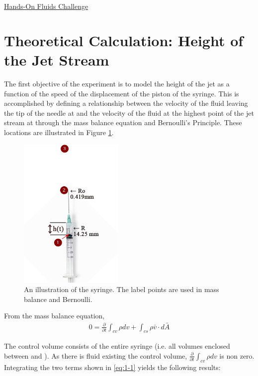 \documentclass{article}
\newcommand*\circled[1]{\tikz[baseline=(char.base)]{
            \node[shape=circle,draw,inner sep=2pt] (char) {#1};}}
\begin{document}
\begin{center}\underline{\huge Hands-On Fluids Challenge}\end{center}

\section{Theoretical Calculation: Height of the Jet Stream}
%
The first objective of the experiment is to model the height of the jet as a function of the speed of the displacement of the piston of the syringe. This is accomplished by defining a relationship between the velocity of the fluid leaving the tip of the needle at \circled{2} and the velocity of the fluid at the highest point of the jet stream at \circled{3} through the mass balance equation and Bernoulli's Principle. These locations are illustrated in Figure \ref{fig:1}.

%
\begin{figure}[h!]
\centering
  \includegraphics[width=50mm]{Syringe.png}
  \captionsetup{justification=centering}
  \caption{An illustration of the syringe. The label points are used in mass balance and Bernoulli.}
  \label{fig:1}
\end{figure}
%
From the mass balance equation,
\begin{align*}
0= \frac{\partial}{\partial{t}} \int_{cv} \rho dv + \int_{cs} \rho \bar{v} \cdot d\bar{A} \label{eq:1-1} \tag{1-1} 
\end{align*} 

The control volume consists of the entire syringe (i.e. all volumes enclosed between \circled{1} and \circled{2}). As there is fluid existing the control volume, $\frac{\partial}{\partial{t}} \int_{cv} \rho dv$ is non zero. Integrating the two terms shown in \eqref{eq:1-1} yields the following results:
\end{document}

